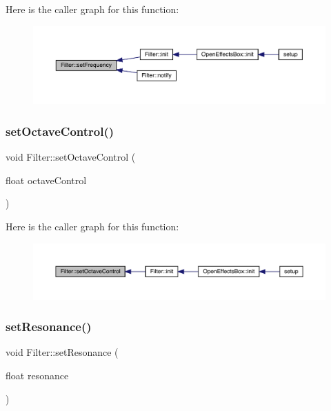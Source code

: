 Here is the caller graph for this function\+:\nopagebreak
\begin{figure}[H]
\begin{center}
\leavevmode
\includegraphics[width=350pt]{class_filter_afe0720f8c3ed40208ebe59d894bf0645_icgraph}
\end{center}
\end{figure}
\mbox{\label{class_filter_ad4e47469cb53f7c7e3f95021c30599cc}} 
\subsubsection{\texorpdfstring{set\+Octave\+Control()}{setOctaveControl()}}
{\footnotesize\ttfamily void Filter\+::set\+Octave\+Control (\begin{DoxyParamCaption}\item[{float}]{octave\+Control }\end{DoxyParamCaption})}

Here is the caller graph for this function\+:\nopagebreak
\begin{figure}[H]
\begin{center}
\leavevmode
\includegraphics[width=350pt]{class_filter_ad4e47469cb53f7c7e3f95021c30599cc_icgraph}
\end{center}
\end{figure}
\mbox{\label{class_filter_a9bd50f058259b8c3bc83daf99cdc9837}} 
\subsubsection{\texorpdfstring{set\+Resonance()}{setResonance()}}
{\footnotesize\ttfamily void Filter\+::set\+Resonance (\begin{DoxyParamCaption}\item[{float}]{resonance }\end{DoxyParamCaption})}

